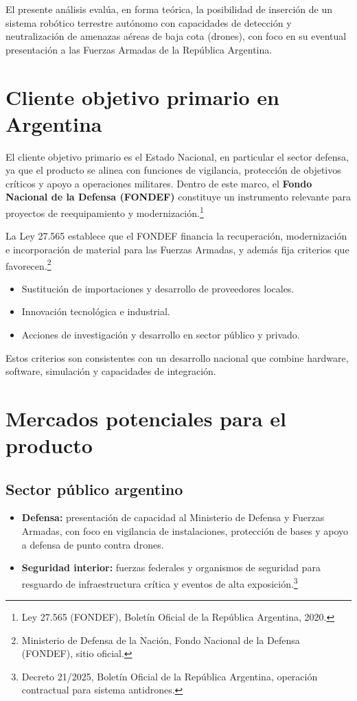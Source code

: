 
El presente análisis evalúa, en forma teórica, la posibilidad de inserción de un sistema robótico terrestre autónomo con capacidades de detección y neutralización de amenazas aéreas de baja cota (drones), con foco en su eventual presentación a las Fuerzas Armadas de la República Argentina.

\section{Cliente objetivo primario en Argentina}

El cliente objetivo primario es el Estado Nacional, en particular el sector defensa, ya que el producto se alinea con funciones de vigilancia, protección de objetivos críticos y apoyo a operaciones militares. Dentro de este marco, el \textbf{Fondo Nacional de la Defensa (FONDEF)} constituye un instrumento relevante para proyectos de reequipamiento y modernización.\footnote{Ley 27.565 (FONDEF), Boletín Oficial de la República Argentina, 2020.}

La Ley 27.565 establece que el FONDEF financia la recuperación, modernización e incorporación de material para las Fuerzas Armadas, y además fija criterios que favorecen.\footnote{Ministerio de Defensa de la Nación, Fondo Nacional de la Defensa (FONDEF), sitio oficial.}
\begin{itemize}
    \item Sustitución de importaciones y desarrollo de proveedores locales.
    \item Innovación tecnológica e industrial.
    \item Acciones de investigación y desarrollo en sector público y privado.
\end{itemize}

Estos criterios son consistentes con un desarrollo nacional que combine hardware, software, simulación y capacidades de integración.

\section{Mercados potenciales para el producto}

\subsection{Sector público argentino}
\begin{itemize}
    \item \textbf{Defensa:} presentación de capacidad al Ministerio de Defensa y Fuerzas Armadas, con foco en vigilancia de instalaciones, protección de bases y apoyo a defensa de punto contra drones.
    \item \textbf{Seguridad interior:} fuerzas federales y organismos de seguridad para resguardo de infraestructura crítica y eventos de alta exposición.\footnote{Decreto 21/2025, Boletín Oficial de la República Argentina, operación contractual para sistema antidrones.}
\end{itemize}

